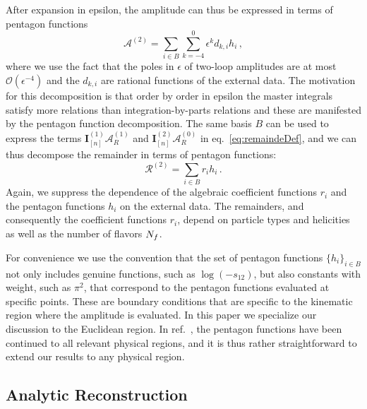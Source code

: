 After expansion in epsilon, the amplitude can thus be expressed in terms
of pentagon functions
\begin{equation}
  \mathcal{A}^{(2)}=
    \sum_{i\in B}\sum_{k=-4}^0\epsilon^{k}
    d_{k,i}h_i\,,
\end{equation}
where we use the fact that the poles in $\epsilon$
of two-loop amplitudes are at most $\mathcal{O}(\epsilon^{-4})$ and
the $d_{k,i}$ are rational functions of the external data.
 The motivation for this decomposition is
that order by order in epsilon the master integrals satisfy more
relations than integration-by-parts relations and these are manifested by the pentagon
function decomposition.
The same basis $B$ can be used to express the terms
$\mathbf{I}_{[n]}^{(1)}\mathcal{A}_R^{(1)}$
and $\mathbf{I}_{[n]}^{(2)}\mathcal{A}_R^{(0)}$ in 
eq.~\eqref{eq:remaindeDef}, and we can thus decompose the remainder
in terms of pentagon functions:
\begin{equation}
\mathcal{R}^{(2)} = \sum_{i \in B} r_i h_i\,.
\label{eq:remainderPentagon}
\end{equation}
Again, we suppress the dependence of the 
algebraic coefficient functions $r_i$ and the pentagon functions $h_i$ on
the external data.
The remainders, and consequently the coefficient 
functions $r_i$, depend on particle types and helicities as well as
the number of flavors ${N_f}$.

For convenience we use the convention that the set of pentagon functions $\{h_i\}_{i\in B}$
not only includes genuine functions, such as $\log(-s_{12})$, but also
constants with weight, such as $\pi^2$, that correspond to the pentagon 
functions evaluated at specific points. These are boundary conditions that
are specific to the kinematic region where the amplitude is evaluated. In
this paper we specialize our discussion to the Euclidean region.
In  ref.~\cite{Gehrmann:2018yef}, the pentagon functions have been continued
to all relevant physical regions, and it is thus rather  straightforward
to extend our results to any physical region.

\subsection{Analytic Reconstruction}

